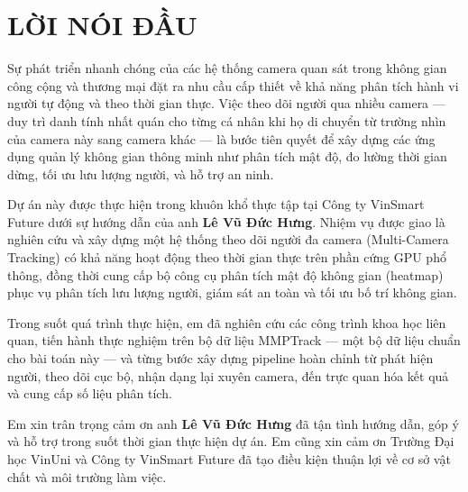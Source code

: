 \section*{LỜI NÓI ĐẦU}
\thispagestyle{empty}

Sự phát triển nhanh chóng của các hệ thống camera quan sát trong không gian công cộng và thương mại đặt ra nhu cầu cấp thiết về khả năng phân tích hành vi người tự động và theo thời gian thực. Việc theo dõi người qua nhiều camera --- duy trì danh tính nhất quán cho từng cá nhân khi họ di chuyển từ trường nhìn của camera này sang camera khác --- là bước tiên quyết để xây dựng các ứng dụng quản lý không gian thông minh như phân tích mật độ, đo lường thời gian dừng, tối ưu lưu lượng người, và hỗ trợ an ninh.

Dự án này được thực hiện trong khuôn khổ thực tập tại Công ty VinSmart Future dưới sự hướng dẫn của anh \textbf{Lê Vũ Đức Hưng}. Nhiệm vụ được giao là nghiên cứu và xây dựng một hệ thống theo dõi người đa camera (Multi-Camera Tracking) có khả năng hoạt động theo thời gian thực trên phần cứng GPU phổ thông, đồng thời cung cấp bộ công cụ phân tích mật độ không gian (heatmap) phục vụ phân tích lưu lượng người, giám sát an toàn và tối ưu bố trí không gian.

Trong suốt quá trình thực hiện, em đã nghiên cứu các công trình khoa học liên quan, tiến hành thực nghiệm trên bộ dữ liệu MMPTrack --- một bộ dữ liệu chuẩn cho bài toán này --- và từng bước xây dựng pipeline hoàn chỉnh từ phát hiện người, theo dõi cục bộ, nhận dạng lại xuyên camera, đến trực quan hóa kết quả và cung cấp số liệu phân tích.

Em xin trân trọng cảm ơn anh \textbf{Lê Vũ Đức Hưng} đã tận tình hướng dẫn, góp ý và hỗ trợ trong suốt thời gian thực hiện dự án. Em
 cũng xin cảm ơn Trường Đại học VinUni và Công ty VinSmart Future đã tạo điều kiện thuận lợi về cơ sở vật chất và môi trường làm việc.

\clearpage
